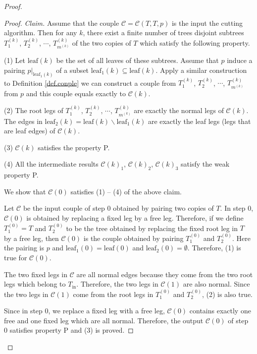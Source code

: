 \begin{proof}
\begin{proof}
\medskip

\textit{Claim.} Assume that the couple $\mathcal{C}=\mathcal{C}(T,T,p)$ is the input the cutting algorithm. Then for any $k$, there exist a finite number of trees disjoint subtrees $T^{(k)}_1$, $T^{(k)}_2$, $\cdots$, $T^{(k)}_{m^{(k)}}$ of the two copies of $T$ which satisfy the following property.

(1) Let $\text{leaf}(k)$ be the set of all leaves of these subtrees. Assume that $p$ induce a pairing $p|_{\text{leaf}_1(k)}$ of a subset $\text{leaf}_1(k)\subseteq\text{leaf}(k)$. Apply a similar construction to Definition \ref{def.conple} we can construct a couple from $T^{(k)}_1$, $T^{(k)}_2$, $\cdots$, $T^{(k)}_{m^{(k)}}$ from $p$ and this couple equals exactly to $\mathcal{C}(k)$.

(2) The root legs of $T^{(k)}_1$, $T^{(k)}_2$, $\cdots$, $T^{(k)}_{m^{(k)}}$ are exactly the normal legs of $\mathcal{C}(k)$. The edges in $\text{leaf}_2(k)=\text{leaf}(k)\backslash \text{leaf}_1(k)$ are exactly the leaf legs (legs that are leaf edges) of $\mathcal{C}(k)$.

(3) $\mathcal{C}(k)$ satisfies the property P.

(4) All the intermediate results  $\mathcal{C}(k)_1$, $\mathcal{C}(k)_2$, $\mathcal{C}(k)_3$ satisfy the weak property P.

\medskip

We show that $\mathcal{C}(0)$ satisfies (1) -- (4) of the above claim.

Let $\mathcal{C}$ be the input couple of step $0$ obtained by pairing two copies of $T$. In step $0$, $\mathcal{C}(0)$ is obtained by replacing a fixed leg by a free leg. Therefore, if we define $T^{(0)}_{1}=T$ and $T^{(0)}_{2}$ to be the tree obtained by replacing the fixed root leg in $T$ by a free leg, then $\mathcal{C}(0)$ is the couple obtained by pairing $T^{(0)}_{1}$ and $T^{(0)}_{2}$. Here the pairing is $p$ and $\text{leaf}_1(0)=\text{leaf}(0)$ and $\text{leaf}_2(0)=\emptyset$. Therefore, (1) is true for $\mathcal{C}(0)$.

The two fixed legs in $\mathcal{C}$ are all normal edges because they come from the two root legs which belong to $T_{\text{in}}$. Therefore, the two legs in $\mathcal{C}(1)$ are also normal. Since the two legs in $\mathcal{C}(1)$ come from the root legs in $T^{(0)}_{1}$ and $T^{(0)}_{2}$, (2) is also true.

Since in step $0$, we replace a fixed leg with a free leg, $\mathcal{C}(0)$ contains exactly one free and one fixed leg which are all normal. Therefore, the output $\mathcal{C}(0)$ of step $0$ satisfies property P and (3) is proved.


\end{proof}
\end{proof}
